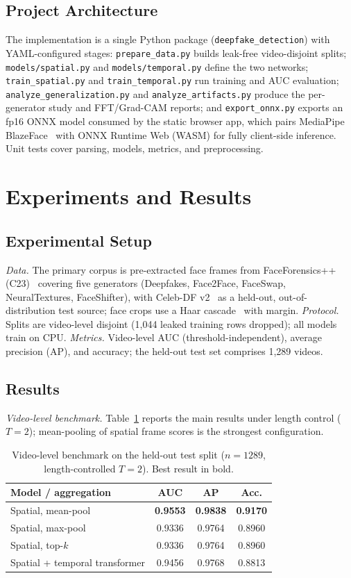 \documentclass[conference]{IEEEtran}
\begin{document}
\subsection{Project Architecture}
The implementation is a single Python package (\texttt{deepfake\_detection}) with YAML-configured stages: \texttt{prepare\_data.py} builds leak-free video-disjoint splits; \texttt{models/spatial.py} and \texttt{models/temporal.py} define the two networks; \texttt{train\_spatial.py} and \texttt{train\_temporal.py} run training and AUC evaluation; \texttt{analyze\_generalization.py} and \texttt{analyze\_artifacts.py} produce the per-generator study and FFT/Grad-CAM reports; and \texttt{export\_onnx.py} exports an fp16 ONNX model consumed by the static browser app, which pairs MediaPipe BlazeFace~\cite{lugaresi2019mediapipe} with ONNX Runtime Web (WASM) for fully client-side inference. Unit tests cover parsing, models, metrics, and preprocessing.

\section{Experiments and Results}
\subsection{Experimental Setup}
\emph{Data.} The primary corpus is pre-extracted face frames from FaceForensics++ (C23)~\cite{rossler2019ff} covering five generators (Deepfakes, Face2Face, FaceSwap, NeuralTextures, FaceShifter), with Celeb-DF v2~\cite{li2020celebdf} as a held-out, out-of-distribution test source; face crops use a Haar cascade~\cite{viola2004robust} with margin. \emph{Protocol.} Splits are video-level disjoint (1{,}044 leaked training rows dropped); all models train on CPU. \emph{Metrics.} Video-level AUC (threshold-independent), average precision (AP), and accuracy; the held-out test set comprises 1{,}289 videos.

\subsection{Results}
\emph{Video-level benchmark.} Table~\ref{tab:benchmark} reports the main results under length control ($T=2$); mean-pooling of spatial frame scores is the strongest configuration.

\begin{table}[htbp]
\caption{Video-level benchmark on the held-out test split ($n=1289$, length-controlled $T=2$). Best result in bold.}
\label{tab:benchmark}
\centering
\renewcommand{\arraystretch}{1.15}
\begin{tabular}{@{}lccc@{}}
\toprule
Model / aggregation & AUC & AP & Acc.\\
\midrule
Spatial, mean-pool & \textbf{0.9553} & \textbf{0.9838} & \textbf{0.9170}\\
Spatial, max-pool & 0.9336 & 0.9764 & 0.8960\\
Spatial, top-$k$ & 0.9336 & 0.9764 & 0.8960\\
Spatial + temporal transformer & 0.9456 & 0.9768 & 0.8813\\
\bottomrule
\end{tabular}
\end{table}
\end{document}
